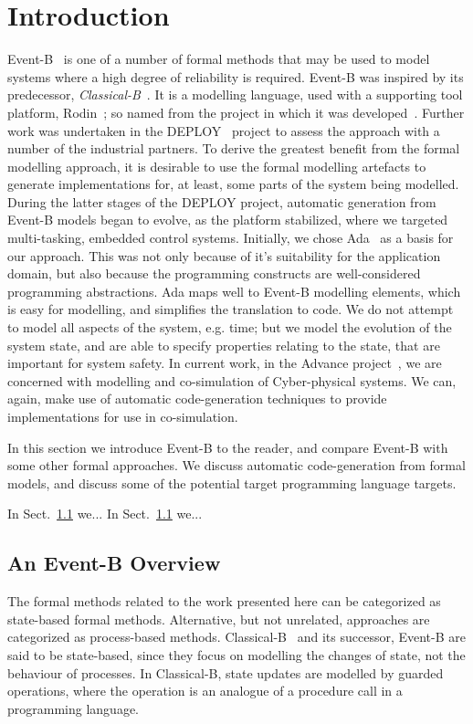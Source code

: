 \section{Introduction}
Event-B~\cite{ABR10} is one of a number of formal methods that may be used to model systems where a high degree of reliability is required. Event-B was inspired by its predecessor, \emph{Classical-B}~\cite{TheBBook}. It is a modelling language, used with a supporting tool platform, Rodin~\cite{abrial10rodin}; so named from the project in which it was developed~\cite{RodinTool}. Further work was undertaken in the DEPLOY~\cite{DEPLOY} project to assess the approach with a number of the industrial partners. To derive the greatest benefit from the formal modelling approach, it is desirable to use the formal modelling artefacts to generate implementations for, at least, some parts of the system being modelled. During the latter stages of the DEPLOY project, automatic generation from Event-B models began to evolve, as the platform stabilized, where we targeted multi-tasking, embedded control systems. Initially, we chose Ada~\cite{ada2005} as a basis for our approach. This was not only because of it's suitability for the application domain, but also because the programming constructs are well-considered programming abstractions. Ada maps well to Event-B modelling elements, which is easy for modelling, and simplifies the translation to code. We do not attempt to model all aspects of the system, e.g. time; but we model the evolution of the system state, and are able to specify properties relating to the state, that are important for system safety. In current work, in the Advance project~\cite{advance}, we are concerned with modelling and co-simulation of Cyber-physical systems. We can, again, make use of automatic code-generation techniques to provide implementations for use in co-simulation.    

In this section we introduce Event-B to the reader, and compare Event-B with some other formal approaches. We discuss automatic code-generation from formal models, and discuss some of the potential target programming language targets.

In Sect.~\ref{} we...
In Sect.~\ref{} we...

\subsection{An Event-B Overview}
The formal methods related to the work presented here can be categorized as state-based formal methods. Alternative, but not unrelated, approaches are categorized as process-based methods. Classical-B~\cite{TheBBook,CNP,CNPInterface,B4Free} and its successor, Event-B are said to be state-based, since they focus on modelling the changes of state, not the behaviour of processes. In Classical-B, state updates are modelled by guarded operations, where the operation is an analogue of a procedure call in a programming language.


